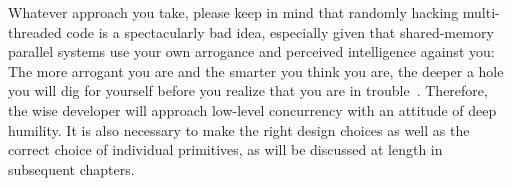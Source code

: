 Whatever approach you take, please keep in mind that randomly hacking
multi-threaded code is a spectacularly bad idea, especially given that
shared-memory parallel systems use your own arrogance and perceived
intelligence against you:
The more arrogant you are and the smarter you think you are, the deeper
a hole you will dig for yourself before you realize that you are in
trouble~\cite{DeadlockEmpire2016}.
Therefore, the wise developer will approach low-level concurrency with
an attitude of deep humility.
It is also necessary to make the right design choices as well as the
correct choice of individual primitives, as will be discussed at length
in subsequent chapters.

